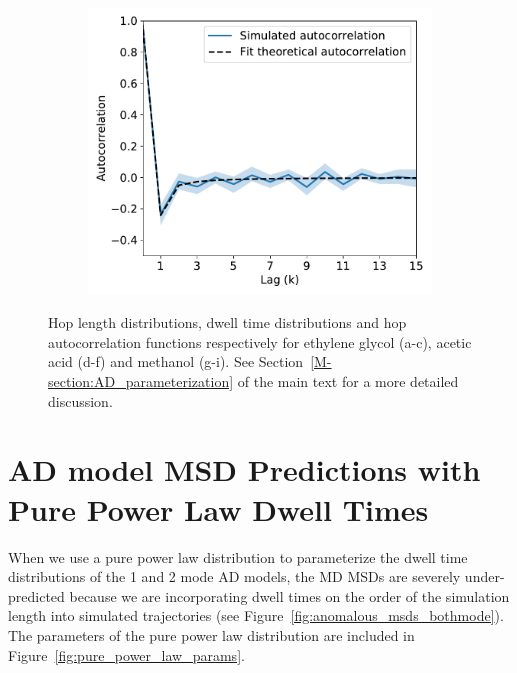 \documentclass{article}
\begin{document}
\begin{figure}[h]
\begin{subfigure}{0.3\textwidth}
  \includegraphics[width=\textwidth]{MET_hop_acf.pdf}
  \caption{}\label{fig:MET_hop_acf}
  \end{subfigure}
  \caption{Hop length distributions, dwell time distributions and hop autocorrelation functions
  respectively for ethylene glycol (a-c), acetic acid (d-f) and methanol (g-i).
  See Section~\ref{M-section:AD_parameterization} of the main text for a more detailed discussion.
  }\label{fig:anticorrelated_hops}
  \end{figure}
  
  \newpage
  
  \section{AD model MSD Predictions with Pure Power Law Dwell Times}\label{section:pure_power_law}
  
  When we use a pure power law distribution to parameterize the dwell time 
  distributions of the 1 and 2 mode AD models, the MD MSDs are severely 
  under-predicted because we are incorporating dwell times on the order of 
  the simulation length into simulated trajectories 
  (see Figure~\ref{fig:anomalous_msds_bothmode}). The parameters of the pure power law 
   distribution are included in Figure~\ref{fig:pure_power_law_params}. 
  
\end{document}
